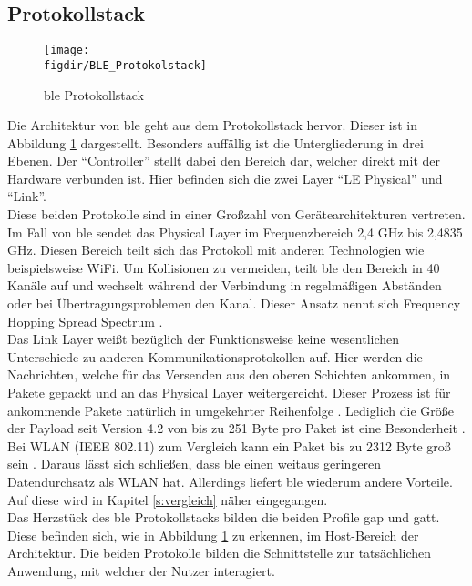 \subsection{Protokollstack}
\label{ss:funktionsweise:protokollstack}

\begin{figure}[!b]
	\centering
	\texttt{[image: \\figdir/BLE\_Protokolstack]}
	\caption[\ac{ble} Protokollstack]{\ac{ble} Protokollstack \cite[Seite 16]{Townsend14:GSB}}
	\label{FIG:protokollstack}
\end{figure}

\noindent Die Architektur von \ac{ble} geht aus dem Protokollstack hervor. Dieser ist in Abbildung \ref{FIG:protokollstack} dargestellt. Besonders auffällig ist die Untergliederung in drei Ebenen. Der "`Controller"' stellt dabei den Bereich dar, welcher direkt mit der Hardware verbunden ist. Hier befinden sich die zwei Layer "`LE Physical"' und "`Link"'.\\
\noindent Diese beiden Protokolle sind in einer Großzahl von Gerätearchitekturen vertreten. Im Fall von \ac{ble} sendet das Physical Layer im Frequenzbereich 2,4 GHz bis 2,4835 GHz. Diesen Bereich teilt sich das Protokoll mit anderen Technologien wie beispielsweise WiFi. Um Kollisionen zu vermeiden, teilt \ac{ble} den Bereich in 40 Kanäle auf und wechselt während der Verbindung in regelmäßigen Abständen oder bei Übertragungsproblemen den Kanal. Dieser Ansatz nennt sich Frequency Hopping Spread Spectrum \cite[Seite 16f]{Townsend14:GSB}.\\  
\noindent Das Link Layer weißt bezüglich der Funktionsweise keine wesentlichen Unterschiede zu anderen Kommunikationsprotokollen auf. Hier werden die Nachrichten, welche für das  Versenden aus den oberen Schichten ankommen, in Pakete gepackt und an das Physical Layer weitergereicht. Dieser Prozess ist für ankommende Pakete natürlich in umgekehrter Reihenfolge \cite[Seit 194]{Tanenbaum14:CN}. Lediglich die Größe der Payload seit Version 4.2 von bis zu 251 Byte pro Paket ist eine Besonderheit \cite{Gupta20:WWW}. Bei WLAN (IEEE 802.11) zum Vergleich kann ein Paket bis zu 2312 Byte groß sein \cite[Seite 233]{Gessler15:WNN}. Daraus lässt sich schließen, dass \ac{ble} einen weitaus geringeren Datendurchsatz als WLAN hat. Allerdings liefert \ac{ble} wiederum andere Vorteile. Auf diese wird in Kapitel \ref{s:vergleich} näher eingegangen.\\
\noindent Das Herzstück des \ac{ble} Protokollstacks bilden die beiden Profile \ac{gap} und \ac{gatt}. Diese befinden sich, wie in Abbildung \ref{FIG:protokollstack} zu erkennen, im Host-Bereich der Architektur. Die beiden Protokolle bilden die Schnittstelle zur tatsächlichen Anwendung, mit welcher der Nutzer interagiert.\\
